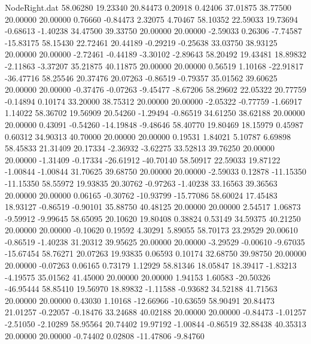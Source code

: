 \begin{filecontents}{NodeRight.dat}
  58.06280   19.23340   20.84473     0.20918    0.42406   37.01875   38.77500   20.00000   20.00000    0.76660   -0.84473    2.32075    4.70467
  58.10352   22.59033   19.73694    -0.68613   -1.40238   34.47500   39.33750   20.00000   20.00000   -2.59033    0.26306   -7.74587  -15.83175
  58.15430   22.72461   20.44189    -0.29219   -0.25638   33.03750   38.93125   20.00000   20.00000   -2.72461   -0.44189   -3.30102   -2.89643
  58.20492   19.43481   18.89832    -2.11863   -3.37207   35.21875   40.11875   20.00000   20.00000    0.56519    1.10168  -22.91817  -36.47716
  58.25546   20.37476   20.07263    -0.86519   -0.79357   35.01562   39.60625   20.00000   20.00000   -0.37476   -0.07263   -9.45477   -8.67206
  58.29602   22.05322   20.77759    -0.14894    0.10174   33.20000   38.75312   20.00000   20.00000   -2.05322   -0.77759   -1.66917    1.14022
  58.36702   19.56909   20.54260    -1.29494   -0.86519   34.61250   38.62188   20.00000   20.00000    0.43091   -0.54260  -14.19848   -9.48646
  58.40770   19.80469   18.15979     0.45987    0.60312   34.90313   40.70000   20.00000   20.00000    0.19531    1.84021    5.10787    6.69898
  58.45833   21.31409   20.17334    -2.36932   -3.62275   33.52813   39.76250   20.00000   20.00000   -1.31409   -0.17334  -26.61912  -40.70140
  58.50917   22.59033   19.87122    -1.00844   -1.00844   31.70625   39.68750   20.00000   20.00000   -2.59033    0.12878  -11.15350  -11.15350
  58.55972   19.93835   20.30762    -0.97263   -1.40238   33.16563   39.36563   20.00000   20.00000    0.06165   -0.30762  -10.93799  -15.77086
  58.60024   17.45483   18.93127    -0.86519   -0.90101   35.88750   40.48125   20.00000   20.00000    2.54517    1.06873   -9.59912   -9.99645
  58.65095   20.10620   19.80408     0.38824    0.53149   34.59375   40.21250   20.00000   20.00000   -0.10620    0.19592    4.30291    5.89055
  58.70173   23.29529   20.00610    -0.86519   -1.40238   31.20312   39.95625   20.00000   20.00000   -3.29529   -0.00610   -9.67035  -15.67454
  58.76271   20.07263   19.93835     0.06593    0.10174   32.68750   39.98750   20.00000   20.00000   -0.07263    0.06165    0.73179    1.12929
  58.81346   18.05847   18.39417    -1.83213   -4.19575   35.01562   41.45000   20.00000   20.00000    1.94153    1.60583  -20.50326  -46.95444
  58.85410   19.56970   18.89832    -1.11588   -0.93682   34.52188   41.71563   20.00000   20.00000    0.43030    1.10168  -12.66966  -10.63659
  58.90491   20.84473   21.01257    -0.22057   -0.18476   33.24688   40.02188   20.00000   20.00000   -0.84473   -1.01257   -2.51050   -2.10289
  58.95564   20.74402   19.97192    -1.00844   -0.86519   32.88438   40.35313   20.00000   20.00000   -0.74402    0.02808  -11.47806   -9.84760

\end{filecontents}

